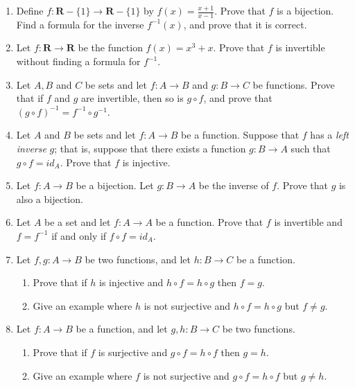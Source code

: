 \documentclass[12pt]{article}
\begin{document}
\begin{enumerate}
\item Define $f \colon \mathbf{R}-\{1\} \to \mathbf{R} - \{1\}$ by $f(x) = \frac{x+1}{x-1}$. Prove that $f$ is a bijection. Find a formula for the inverse $f^{-1}(x)$, and prove that it is correct.
\item Let $f \colon \mathbf{R} \to \mathbf{R}$ be the function $f(x) = x^3 + x$. Prove that $f$ is invertible without finding a formula for $f^{-1}$.
\item Let $A, B$ and $C$ be sets and let $f \colon A \to B$ and $g \colon B \to C$ be functions. Prove that if $f$ and $g$ are invertible, then so is $g \circ f$, and prove that $(g \circ f)^{-1} = f^{-1} \circ g^{-1}$.
\item Let $A$ and $B$ be sets and let $f \colon A \to B$ be a function. Suppose that $f$ has a \emph{left inverse} $g$; that is, suppose that there exists a function $g \colon B \to A$ such that $g \circ f = id_A$. Prove that $f$ is injective.
\item Let $f \colon A \to B$ be a bijection. Let $g \colon B \to A$ be the inverse of $f$. Prove that $g$ is also a bijection.
\item Let $A$ be a set and let $f \colon A \to A$ be a function. Prove that $f$ is invertible and $f = f^{-1}$ if and only if $f \circ f = id_A$.

\item Let $f,g \colon A \to B$ be two functions, and let $h \colon B \to C$ be a function. 
  \begin{enumerate}
  \item Prove that if $h$ is injective and
    $h \circ f = h \circ g$ then $f = g$.
  \item Give an example where $h$ is not surjective and     $h \circ f = h \circ g$ but $f \neq g$.
\end{enumerate}
  
\item Let $f \colon A \to B$ be a function, and let $g,h \colon B \to C$ be two functions. 
  \begin{enumerate}
  \item Prove that if $f$ is surjective and
    $g \circ f = h \circ f$ then $g = h$.
  \item Give an example where $f$ is not surjective and $g \circ f = h \circ f$ but $g \neq h$.
\end{enumerate}

\end{enumerate}
\end{document}

